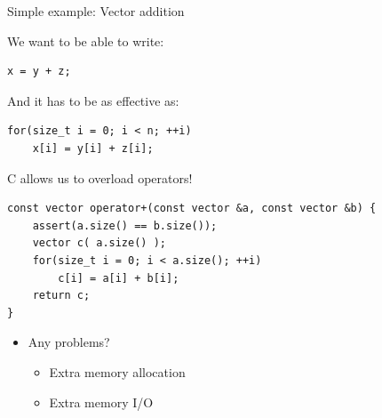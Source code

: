 \documentclass[@BEAMER_OPTIONS@]{beamer}
\newcommand{\plusplus}{{\nolinebreak[4]\hspace{-.05em}\raisebox{.4ex}{\tiny\bf ++}}\xspace}
\newcommand{\Cpp}{C\plusplus}
\begin{document}
\note{ }

\begin{frame}[fragile]{Simple example: Vector addition}
    \begin{exampleblock}{We want to be able to write:}
        \begin{lstlisting}
x = y + z;
        \end{lstlisting}
    \end{exampleblock}

    \begin{exampleblock}{And it has to be as effective as:}
        \begin{lstlisting}
for(size_t i = 0; i < n; ++i)
    x[i] = y[i] + z[i];
        \end{lstlisting}
    \end{exampleblock}
\end{frame}

\note{ }

\begin{frame}[fragile]{\Cpp allows us to overload operators!}
    \begin{exampleblock}{}
        \begin{lstlisting}
const vector operator+(const vector &a, const vector &b) {
    assert(a.size() == b.size());
    vector c( a.size() );
    for(size_t i = 0; i < a.size(); ++i)
        c[i] = a[i] + b[i];
    return c;
}
        \end{lstlisting}
    \end{exampleblock}
    \begin{itemize}
        \item<2-> Any problems?
            \begin{itemize}
                \item<3-> Extra memory allocation
                \item<4-> Extra memory I/O
            \end{itemize}
    \end{itemize}
\end{frame}

\note{ }
\end{document}
